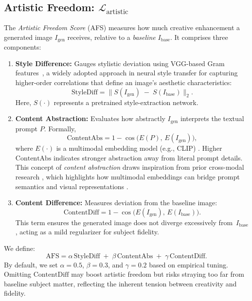 \subsection{Artistic Freedom: \(\mathcal{L}_{\text{artistic}}\)}

The \emph{Artistic Freedom Score} (AFS) measures how much creative enhancement a generated image \(I_{\text{gen}}\) receives, relative to a \emph{baseline} \(I_{\text{base}}\). It comprises three components:

\begin{enumerate}
    \item \textbf{Style Difference:}  
    Gauges stylistic deviation using VGG-based Gram features~\cite{gatys2016neural, johnson2016perceptual}, a widely adopted approach in neural style transfer for capturing higher-order correlations that define an image’s aesthetic characteristics:
    \[
    \text{StyleDiff} 
    = 
    \bigl\| S(I_{\text{gen}}) \;-\; S(I_{\text{base}}) \bigr\|_2.
    \]
    Here, \(S(\cdot)\) represents a pretrained style-extraction network.

    \item \textbf{Content Abstraction:}  
    Evaluates how abstractly \(I_{\text{gen}}\) interprets the textual prompt \(P\). Formally,
    \[
    \text{ContentAbs}
    =
    1 - \cos\bigl(E(P),\, E(I_{\text{gen}})\bigr),
    \]
    where \(E(\cdot)\) is a multimodal embedding model (e.g., CLIP) \cite{radford2021learning}. Higher \(\text{ContentAbs}\) indicates stronger abstraction away from literal prompt details. This concept of \emph{content abstraction} draws inspiration from prior cross-modal research \cite{zhang2021crossmodal, mou2022abstraction}, which highlights how multimodal embeddings can bridge prompt semantics and visual representations \cite{lei2023understanding, gupta2023prompt}.

    \item \textbf{Content Difference:}
    Measures deviation from the baseline image:
    \[
    \text{ContentDiff}
    =
    1 - \cos\bigl(E(I_{\text{gen}}),\, E(I_{\text{base}})\bigr).
    \]
    This term ensures the generated image does not diverge excessively from \(\,I_{\text{base}}\), acting as a mild regularizer for subject fidelity.
\end{enumerate}

We define:
\[
\text{AFS}
=
\alpha \,\text{StyleDiff}
\;+\;
\beta \,\text{ContentAbs}
\;+\;
\gamma \,\text{ContentDiff}.
\]
By default, we set \(\alpha=0.5\), \(\beta=0.3\), and \(\gamma=0.2\) based on empirical tuning. Omitting \(\text{ContentDiff}\) may boost artistic freedom but risks straying too far from baseline subject matter, reflecting the inherent tension between creativity and fidelity. 

